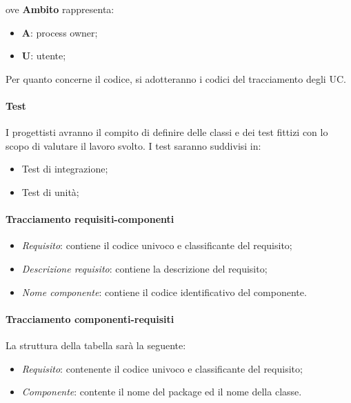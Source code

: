ove \textbf{Ambito} rappresenta:
\begin{itemize}
\item \textbf{A}: process owner;
\item \textbf{U}: utente;
\end{itemize}

Per quanto concerne il codice, si adotteranno i codici del tracciamento degli UC.

\paragraph{Test} I progettisti avranno il compito di definire delle classi e dei test fittizi con lo scopo di valutare il lavoro svolto.
I test saranno suddivisi in:
\begin{itemize}
\item Test di integrazione;
\item Test di unità;
\end{itemize}

\paragraph{Tracciamento requisiti-componenti}

\begin{itemize}
\item \textit{Requisito}: contiene il codice univoco e classificante del requisito;
\item \textit{Descrizione requisito}: contiene la descrizione del requisito;
\item \textit{Nome componente}: contiene il codice identificativo del componente.
\end{itemize}

\paragraph{Tracciamento componenti-requisiti}
La struttura della tabella sarà la seguente:
\begin{itemize}
\item \textit{Requisito}: contenente il codice univoco e classificante del requisito;
\item \textit{Componente}: contente il nome del package ed il nome della classe.
\end{itemize}

